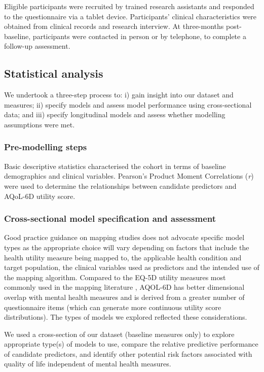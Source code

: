 \documentclass[
  journal=largetwo,
  manuscript=original-article,
  year=2023-Submission,
]{cup-journal}
\begin{document}
Eligible participants were recruited by trained research assistants and responded to the questionnaire via a tablet device. Participants' clinical characteristics were obtained from clinical records and research interview. At three-months post-baseline, participants were contacted in person or by telephone, to complete a follow-up assessment.

\subsection{Statistical analysis}

We undertook a three-step process to: i) gain insight into our dataset and measures; ii) specify models and assess model performance using cross-sectional data; and iii) specify longitudinal models and assess whether modelling assumptions were met.

\subsubsection{Pre-modelling steps}

Basic descriptive statistics characterised the cohort in terms of baseline demographics and clinical variables. Pearson's Product Moment Correlations (\emph{r}) were used to determine the relationships between candidate predictors and AQoL-6D utility score.

\subsubsection{Cross-sectional model specification and assessment}

Good practice guidance on mapping studies \autocite{Wailoo2017} does not advocate specific model types as the appropriate choice will vary depending on factors that include the health utility measure being mapped to, the applicable health condition and target population, the clinical variables used as predictors and the intended use of the mapping algorithm. Compared to the EQ-5D utility measures most commonly used in the mapping literature \autocite{Mukuria2019}, AQOL-6D has better dimensional overlap with mental health measures \autocite{RN6} and is derived from a greater number of questionnaire items (which can generate more continuous utility score distributions). The types of models we explored reflected these considerations.

We used a cross-section of our dataset (baseline measures only) to explore appropriate type(s) of models to use, compare the relative predictive performance of candidate predictors, and identify other potential risk factors associated with quality of life independent of mental health measures.
\end{document}

